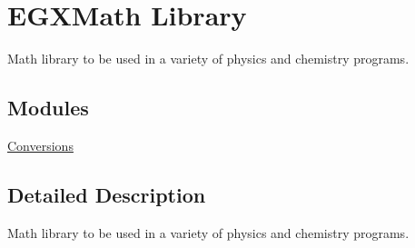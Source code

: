\hypertarget{group___e_g_x_math}{}\section{E\+G\+X\+Math Library}
\label{group___e_g_x_math}


Math library to be used in a variety of physics and chemistry programs.  


\subsection*{Modules}
\begin{DoxyCompactItemize}
\item 
\mbox{\hyperlink{group___e_g_x_math-_conversions}{Conversions}}
\end{DoxyCompactItemize}


\subsection{Detailed Description}
Math library to be used in a variety of physics and chemistry programs. 

